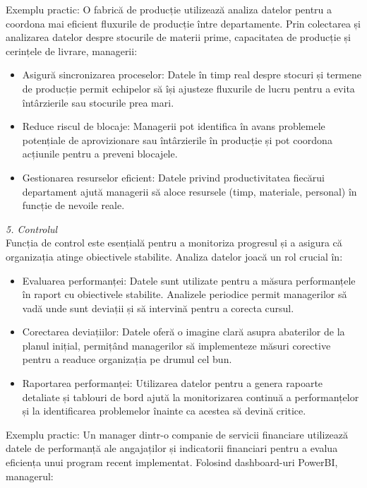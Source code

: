 \documentclass[
  11pt,
  b5paper,
  nottoc]{book}
\providecommand{\tightlist}{%
  \setlength{\itemsep}{0pt}\setlength{\parskip}{0pt}}\usepackage{longtable,booktabs,array}
\begin{document}
Exemplu practic: O fabrică de producție utilizează analiza datelor
pentru a coordona mai eficient fluxurile de producție între
departamente. Prin colectarea și analizarea datelor despre stocurile de
materii prime, capacitatea de producție și cerințele de livrare,
managerii:

\begin{itemize}
\tightlist
\item
  Asigură sincronizarea proceselor: Datele în timp real despre stocuri
  și termene de producție permit echipelor să își ajusteze fluxurile de
  lucru pentru a evita întârzierile sau stocurile prea mari.\\
\item
  Reduce riscul de blocaje: Managerii pot identifica în avans problemele
  potențiale de aprovizionare sau întârzierile în producție și pot
  coordona acțiunile pentru a preveni blocajele.\\
\item
  Gestionarea resurselor eficient: Datele privind productivitatea
  fiecărui departament ajută managerii să aloce resursele (timp,
  materiale, personal) în funcție de nevoile reale.
\end{itemize}

\emph{5. Controlul}\\
Funcția de control este esențială pentru a monitoriza progresul și a
asigura că organizația atinge obiectivele stabilite. Analiza datelor
joacă un rol crucial în:

\begin{itemize}
\tightlist
\item
  Evaluarea performanței: Datele sunt utilizate pentru a măsura
  performanțele în raport cu obiectivele stabilite. Analizele periodice
  permit managerilor să vadă unde sunt deviații și să intervină pentru a
  corecta cursul.\\
\item
  Corectarea deviațiilor: Datele oferă o imagine clară asupra abaterilor
  de la planul inițial, permițând managerilor să implementeze măsuri
  corective pentru a readuce organizația pe drumul cel bun.\\
\item
  Raportarea performanței: Utilizarea datelor pentru a genera rapoarte
  detaliate și tablouri de bord ajută la monitorizarea continuă a
  performanțelor și la identificarea problemelor înainte ca acestea să
  devină critice.
\end{itemize}

Exemplu practic: Un manager dintr-o companie de servicii financiare
utilizează datele de performanță ale angajaților și indicatorii
financiari pentru a evalua eficiența unui program recent implementat.
Folosind dashboard-uri PowerBI, managerul:
\end{document}
